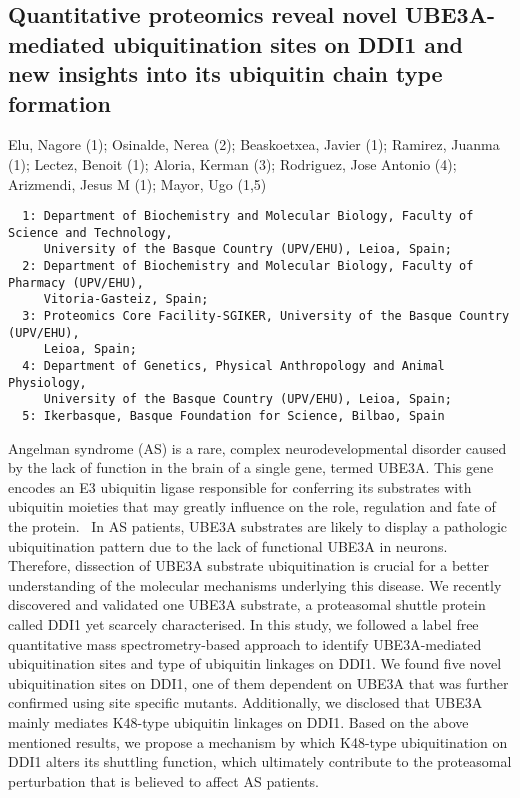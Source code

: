 {\subsection*{\color{eubicRed} Quantitative proteomics reveal novel UBE3A-mediated ubiquitination sites on DDI1 and new insights into its ubiquitin chain type formation}
{\color{eubicGray}Elu, Nagore (1);
Osinalde, Nerea (2);
Beaskoetxea, Javier (1);
Ramirez, Juanma (1);
Lectez, Benoit (1);
Aloria, Kerman (3);
Rodriguez, Jose Antonio (4);
Arizmendi, Jesus M (1);
Mayor, Ugo (1,5)}
{\color{eubicGray}\begin{verbatim}
  1: Department of Biochemistry and Molecular Biology, Faculty of Science and Technology,
     University of the Basque Country (UPV/EHU), Leioa, Spain;
  2: Department of Biochemistry and Molecular Biology, Faculty of Pharmacy (UPV/EHU),
     Vitoria-Gasteiz, Spain;
  3: Proteomics Core Facility-SGIKER, University of the Basque Country (UPV/EHU),
     Leioa, Spain;
  4: Department of Genetics, Physical Anthropology and Animal Physiology,
     University of the Basque Country (UPV/EHU), Leioa, Spain;
  5: Ikerbasque, Basque Foundation for Science, Bilbao, Spain
\end{verbatim}}

Angelman syndrome (AS) is a rare, complex neurodevelopmental disorder caused by the lack of function in the brain of a single gene, termed UBE3A. This gene encodes an E3 ubiquitin ligase responsible for conferring its substrates with ubiquitin moieties that may greatly influence on the role, regulation and fate of the protein.  In AS patients, UBE3A substrates are likely to display a pathologic ubiquitination pattern due to the lack of functional UBE3A in neurons. Therefore, dissection of UBE3A substrate ubiquitination is crucial for a better understanding of the molecular mechanisms underlying this disease. We recently discovered and validated one UBE3A substrate, a proteasomal shuttle protein called DDI1 yet scarcely characterised. In this study, we followed a label free quantitative mass spectrometry-based approach to identify UBE3A-mediated ubiquitination sites and type of ubiquitin linkages on DDI1. We found five novel ubiquitination sites on DDI1, one of them dependent on UBE3A that was further confirmed using site specific mutants. Additionally, we disclosed that UBE3A mainly mediates K48-type ubiquitin linkages on DDI1. Based on the above mentioned results, we propose a mechanism by which K48-type ubiquitination on DDI1 alters its shuttling function, which ultimately contribute to the proteasomal perturbation that is believed to affect AS patients.


}
